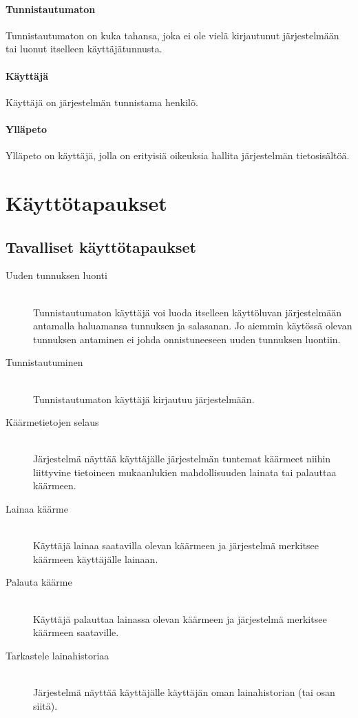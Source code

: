 \documentclass[11pt]{article}
\begin{document}
\paragraph{Tunnistautumaton} Tunnistautumaton on kuka tahansa, joka ei ole vielä kirjautunut järjestelmään tai luonut itselleen käyttäjätunnusta.
\paragraph{Käyttäjä} Käyttäjä on järjestelmän tunnistama henkilö.
\paragraph{Ylläpeto} Ylläpeto on käyttäjä, jolla on erityisiä oikeuksia hallita järjestelmän tietosisältöä.

\section{Käyttötapaukset}

\subsection{Tavalliset käyttötapaukset}

\begin{description}
\item[Uuden tunnuksen luonti] \hfill \\
Tunnistautumaton käyttäjä voi luoda itselleen käyttöluvan järjestelmään antamalla haluamansa tunnuksen ja salasanan. Jo aiemmin käytössä olevan tunnuksen antaminen ei johda onnistuneeseen uuden tunnuksen luontiin.
\item[Tunnistautuminen] \hfill \\
Tunnistautumaton käyttäjä kirjautuu järjestelmään.
\item[Käärmetietojen selaus] \hfill \\
Järjestelmä näyttää käyttäjälle järjestelmän tuntemat käärmeet niihin liittyvine tietoineen mukaanlukien mahdollisuuden lainata tai palauttaa käärmeen.
\item[Lainaa käärme] \hfill \\
Käyttäjä lainaa saatavilla olevan käärmeen ja järjestelmä merkitsee käärmeen käyttäjälle lainaan.
\item[Palauta käärme] \hfill \\
Käyttäjä palauttaa lainassa olevan käärmeen ja järjestelmä merkitsee käärmeen saataville.
\item[Tarkastele lainahistoriaa] \hfill \\
Järjestelmä näyttää käyttäjälle käyttäjän oman lainahistorian (tai osan siitä).
\end{description}
\end{document}
